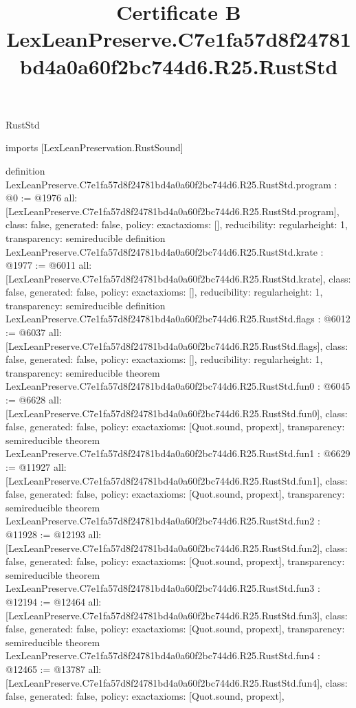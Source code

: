 \begin{lexlean}{RustStd}
\title{Certificate B LexLeanPreserve.C7e1fa57d8f24781bd4a0a60f2bc744d6.R25.RustStd}
\begin{coremodule}
imports [LexLeanPreservation.RustSound]

definition LexLeanPreserve.C7e1fa57d8f24781bd4a0a60f2bc744d6.R25.RustStd.program : @0 := @1976 {
  all: [LexLeanPreserve.C7e1fa57d8f24781bd4a0a60f2bc744d6.R25.RustStd.program],
  class: false,
  generated: false,
  policy: exact{axioms: []},
  reducibility: regular{height: 1},
  transparency: semireducible
}
definition LexLeanPreserve.C7e1fa57d8f24781bd4a0a60f2bc744d6.R25.RustStd.krate : @1977 := @6011 {
  all: [LexLeanPreserve.C7e1fa57d8f24781bd4a0a60f2bc744d6.R25.RustStd.krate],
  class: false,
  generated: false,
  policy: exact{axioms: []},
  reducibility: regular{height: 1},
  transparency: semireducible
}
definition LexLeanPreserve.C7e1fa57d8f24781bd4a0a60f2bc744d6.R25.RustStd.flags : @6012 := @6037 {
  all: [LexLeanPreserve.C7e1fa57d8f24781bd4a0a60f2bc744d6.R25.RustStd.flags],
  class: false,
  generated: false,
  policy: exact{axioms: []},
  reducibility: regular{height: 1},
  transparency: semireducible
}
theorem LexLeanPreserve.C7e1fa57d8f24781bd4a0a60f2bc744d6.R25.RustStd.fun0 : @6045 := @6628 {
  all: [LexLeanPreserve.C7e1fa57d8f24781bd4a0a60f2bc744d6.R25.RustStd.fun0],
  class: false,
  generated: false,
  policy: exact{axioms: [Quot.sound, propext]},
  transparency: semireducible
}
theorem LexLeanPreserve.C7e1fa57d8f24781bd4a0a60f2bc744d6.R25.RustStd.fun1 : @6629 := @11927 {
  all: [LexLeanPreserve.C7e1fa57d8f24781bd4a0a60f2bc744d6.R25.RustStd.fun1],
  class: false,
  generated: false,
  policy: exact{axioms: [Quot.sound, propext]},
  transparency: semireducible
}
theorem LexLeanPreserve.C7e1fa57d8f24781bd4a0a60f2bc744d6.R25.RustStd.fun2 : @11928 := @12193 {
  all: [LexLeanPreserve.C7e1fa57d8f24781bd4a0a60f2bc744d6.R25.RustStd.fun2],
  class: false,
  generated: false,
  policy: exact{axioms: [Quot.sound, propext]},
  transparency: semireducible
}
theorem LexLeanPreserve.C7e1fa57d8f24781bd4a0a60f2bc744d6.R25.RustStd.fun3 : @12194 := @12464 {
  all: [LexLeanPreserve.C7e1fa57d8f24781bd4a0a60f2bc744d6.R25.RustStd.fun3],
  class: false,
  generated: false,
  policy: exact{axioms: [Quot.sound, propext]},
  transparency: semireducible
}
theorem LexLeanPreserve.C7e1fa57d8f24781bd4a0a60f2bc744d6.R25.RustStd.fun4 : @12465 := @13787 {
  all: [LexLeanPreserve.C7e1fa57d8f24781bd4a0a60f2bc744d6.R25.RustStd.fun4],
  class: false,
  generated: false,
  policy: exact{axioms: [Quot.sound, propext]},
}
\end{coremodule}
\end{lexlean}

